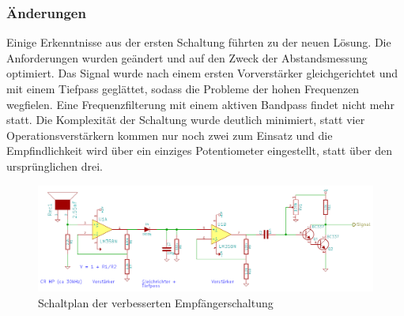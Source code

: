 \subsubsection{Änderungen}
Einige Erkenntnisse aus der ersten Schaltung führten zu der neuen Lösung. Die Anforderungen wurden geändert und auf den Zweck der Abstandsmessung optimiert. Das Signal wurde nach einem ersten Vorverstärker gleichgerichtet und mit einem Tiefpass geglättet, sodass die Probleme der hohen Frequenzen wegfielen. Eine Frequenzfilterung mit einem aktiven Bandpass findet nicht mehr statt. Die Komplexität der Schaltung wurde deutlich minimiert, statt vier Operationsverstärkern kommen nur noch zwei zum Einsatz und die Empfindlichkeit wird über ein einziges Potentiometer eingestellt, statt über den ursprünglichen drei.

\begin{landscape}
	\begin{figure}
		\centering
		\includegraphics[width=(1.5\textwidth)]{images/empfanger2.png}
		\caption{Schaltplan der verbesserten Empfängerschaltung} \label{img:Empf2}
	\end{figure}
\end{landscape}

